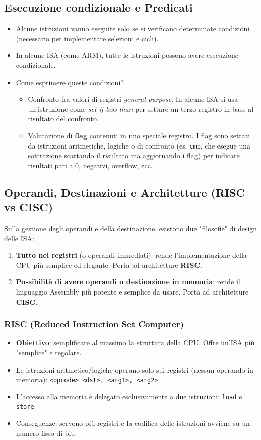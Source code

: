 \documentclass[12pt, a4paper]{article}
\begin{document}
\subsection{Esecuzione condizionale e Predicati}
\begin{itemize}
    \item Alcune istruzioni vanno eseguite solo se si verificano determinate condizioni (necessario per implementare selezioni e cicli).
    \item In alcune ISA (come ARM), tutte le istruzioni possono avere esecuzione condizionale.
    \item Come esprimere queste condizioni?
    \begin{itemize}
        \item Confronto fra valori di registri \textit{general-purpose}. In alcune ISA si usa un'istruzione come \textit{set if less than} per settare un terzo registro in base al risultato del confronto.
        \item Valutazione di \textbf{flag} contenuti in uno speciale registro. I flag sono settati da istruzioni aritmetiche, logiche o di confronto (es. \texttt{cmp}, che esegue una sottrazione scartando il risultato ma aggiornando i flag) per indicare risultati pari a 0, negativi, overflow, ecc.
    \end{itemize}
\end{itemize}

\subsection{Operandi, Destinazioni e Architetture (RISC vs CISC)}
Sulla gestione degli operandi e della destinazione, esistono due "filosofie" di design delle ISA:
\begin{enumerate}
    \item \textbf{Tutto nei registri} (o operandi immediati): rende l'implementazione della CPU più semplice ed elegante. Porta ad architetture \textbf{RISC}.
    \item \textbf{Possibilità di avere operandi o destinazione in memoria}: rende il linguaggio Assembly più potente e semplice da usare. Porta ad architetture \textbf{CISC}.
\end{enumerate}

\subsubsection{RISC (Reduced Instruction Set Computer)}
\begin{itemize}
    \item \textbf{Obiettivo}: semplificare al massimo la struttura della CPU. Offre un'ISA più "semplice" e regolare.
    \item Le istruzioni aritmetico/logiche operano solo sui registri (nessun operando in memoria): \texttt{<opcode> <dst>, <arg1>, <arg2>}.
    \item L'accesso alla memoria è delegato esclusivamente a due istruzioni: \texttt{load} e \texttt{store}.
    \item Conseguenze: servono più registri e la codifica delle istruzioni avviene su un numero fisso di bit.
\end{itemize}
\end{document}
